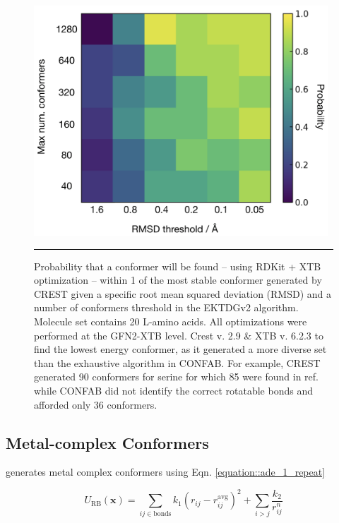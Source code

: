 \documentclass[../../main.tex]{subfiles}
\begin{document}
\begin{figure}[h!]
	\vspace{0.4cm}
	\centering
	\includegraphics[width=11cm]{5/autode/figs/figS2}
	\vspace{0.4cm}
	\hrule
	\caption{Probability that a conformer will be found -- using RDKit + XTB optimization -- within 1 \kcalx of the most stable conformer generated by CREST given a specific root mean squared deviation (RMSD) and a number of conformers threshold in the EKTDGv2 algorithm. Molecule set contains 20 L-amino acids. All optimizations were performed at the GFN2-XTB level. Crest v. 2.9 \& XTB v. 6.2.3 to find the lowest energy conformer, as it generated a more diverse set than the exhaustive algorithm in CONFAB. For example, CREST generated 90 conformers for serine for which 85 were found in ref. \cite{He2016} while CONFAB did not identify the correct rotatable bonds and afforded only 36 conformers.}
	\label{fig::ade_si_2}
\end{figure}

\clearpage
\subsection{Metal-complex Conformers}
\label{section::ade_si_metal_complex_confs}

\ade generates metal complex conformers using Eqn. \eqref{equation::ade_1_repeat}


\begin{equation}
	U_\text{RB}(\boldsymbol{x}) = \sum_{ij \in \text{bonds}} k_1 (r_{ij} - r_{ij}^\text{avg})^2 + \sum_{i > j} \frac{k_2}{r_{ij}^n}
	\label{equation::ade_1_repeat}
\end{equation}
\end{document}
